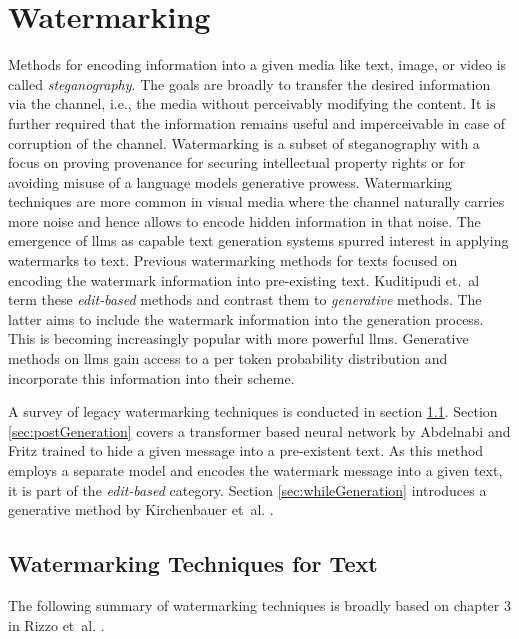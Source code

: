     \section{Watermarking}
    \label{sec:watermarking}
    Methods for encoding information into a given media like text, image, or video is called \emph{steganography}.
    The goals are broadly to transfer the desired information via the channel, i.e., the media without perceivably modifying the content.
    It is further required that the information remains useful and imperceivable in case of corruption of the channel.
    Watermarking is a subset of steganography with a focus on proving provenance for securing intellectual property rights or for avoiding misuse of a language models generative prowess.
    Watermarking techniques are more common in visual media where the channel naturally carries more noise and hence allows to encode hidden information in that noise.
    The emergence of \acp{llm} as capable text generation systems spurred interest in applying watermarks to text.
    Previous watermarking methods for texts focused on encoding the watermark information into pre-existing text.
    Kuditipudi et.~al \cite{kuditipudi2023robust} term these \emph{edit-based} methods and contrast them to \emph{generative} methods.
    The latter aims to include the watermark information into the generation process.
    This is becoming increasingly popular with more powerful \acp{llm}.
    Generative methods on \acp{llm} gain access to a per token probability distribution and incorporate this information into their scheme.

    A survey of legacy watermarking techniques is conducted in section \ref{sec:previousWatermarking}. 
    Section \ref{sec:postGeneration} covers a transformer based neural network by Abdelnabi and Fritz \cite{abdelnabi2021adversarial} trained to hide a given message into a pre-existent text.
    As this method employs a separate model and encodes the watermark message into a given text, it is part of the \emph{edit-based} category.
    Section \ref{sec:whileGeneration} introduces a generative method by Kirchenbauer et~al. \cite{kirchenbauer2023watermark}.

    \subsection{Watermarking Techniques for Text}
    \label{sec:previousWatermarking}
    The following summary of watermarking techniques is broadly based on chapter $3$ in Rizzo et~al. \cite{rizzo2019finegrain}.

